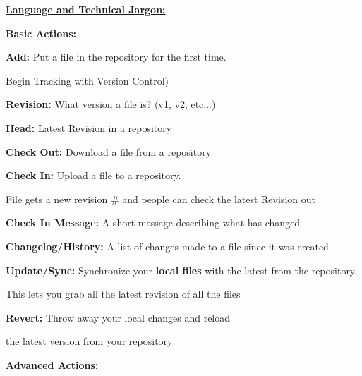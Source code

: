 \documentclass{article}
\begin{document}
\begin{flushleft}
\textbf{\underline{Language and Technical Jargon:}} \\
\par

\textbf{Basic Actions:} \\
\par

\textbf{Add:} Put a file in the repository for the first time. \par
Begin Tracking with Version Control) \\
\par

\textbf{Revision:} What version a file is? (v1, v2, etc...) \\
\par

\textbf{Head:} Latest Revision in a repository \\
\par

\textbf{Check Out:} Download a file from a repository \\
\par

\textbf{Check In:} Upload a file to a repository. \par
File gets a new revision \# and people can check the latest Revision out \\
\par

\textbf{Check In Message:}  A short message describing what has changed \\
\par

\textbf{Changelog/History:} A list of changes made to a file since it was created \\
\par

\textbf{Update/Sync:} Synchronize your \textbf{local files} with the latest from the repository. \par
This lets you grab all the latest revision of all the files \\
\par

\textbf{Revert:} Throw away your local changes and reload \par
the latest version from your repository \\
\par

\textbf{\underline{Advanced Actions:}} \\
\par


\end{flushleft}
\end{document}
